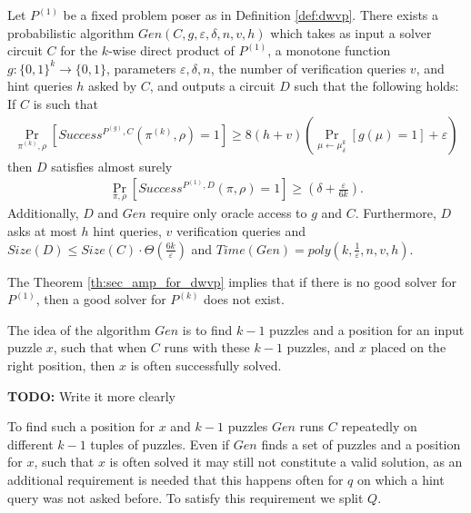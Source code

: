 \begin{theorem}
\label{th:sec_amp_for_dwvp}
Let $P^{(1)}$ be a fixed problem poser as in Definition \ref{def:dwvp}. There exists a probabilistic
algorithm $Gen(C, g, \varepsilon, \delta, n, v, h)$ which takes as input a solver circuit $C$ for the $k$-wise
direct product of $P^{(1)}$, a monotone function $g:\{0,1\}^k \rightarrow \{0,1\}$, parameters $\varepsilon, \delta,n$,
the number of verification queries $v$, and hint queries $h$ asked by $C$, and outputs a circuit $D$
such that the following holds: \\
If $C$ is such that \\
  \begin{align*}
    \underset{\pi^{(k)}, \rho}{\Pr}[Success^{P^{(g)}, C}(\pi^{(k)}, \rho) = 1] \geq 8(h+v) \left(\underset{\mu \leftarrow \mu_\delta^k}{\Pr}[g(\mu) = 1] + \varepsilon\right)
  \end{align*}
then $D$ satisfies almost surely
  \begin{align*}
    \underset{\pi, \rho}{\Pr}[Success^{P^{(1)},D}(\pi, \rho) = 1] \geq (\delta + \frac{\varepsilon}{6k}).
  \end{align*}
Additionally, $D$ and $Gen$ require only oracle access to $g$ and $C$. Furthermore, $D$ asks at most $h$ hint queries, $v$ verification queries and
$Size(D) \leq Size(C) \cdot \Theta(\frac{6k}{\varepsilon})$ and $Time(Gen) = poly(k, \frac{1}{\varepsilon}, n, v, h)$.
\end{theorem}
%
%
The Theorem \ref{th:sec_amp_for_dwvp} implies that if there is no good solver for $P^{(1)}$, then a good solver for $P^{(k)}$ does not exist.

The idea of the algorithm $Gen$ is to find $k-1$ puzzles and a position for an input puzzle $x$, such that
when $C$ runs with these $k-1$ puzzles, and $x$ placed on the right position, then $x$ is often successfully solved.
\begin{todo}
  \textbf{TODO:} Write it more clearly
\end{todo}
To find such a position for $x$ and $k-1$ puzzles $Gen$ runs $C$ repeatedly on different $k-1$ tuples of puzzles.
Even if $Gen$ finds a set of puzzles and a position for $x$, such that $x$ is often solved it may still not
constitute a valid solution, as an additional requirement is needed that this happens often for $q$
on which a hint query was not asked before. To satisfy this requirement we split $Q$.
